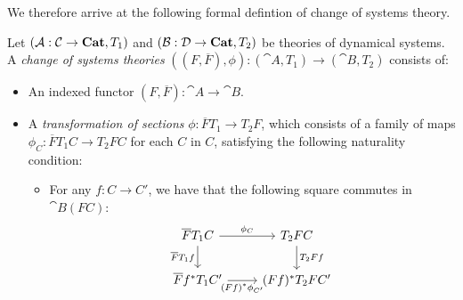 \documentclass[DynamicalBook]{subfiles}
\begin{document}
We therefore arrive at the following formal defintion of change of systems theory.
\begin{definition}\label{def.change_of_doctrine}
  Let $(\mathcal{A} : \mathcal{C} \to \textbf{Cat}, T_1)$ and $(\mathcal{B} : \mathcal{D} \to
  \textbf{Cat}, T_2)$ be theories of dynamical systems. A \emph{change of systems theories}
  $((F, \overline{F}), \phi) : (\cat{A}, T_1) \to (\cat{B}, T_2)$ consists of:
\begin{itemize}
  \item An indexed functor $(F, \overline{F}) : \cat{A} \to \cat{B}$. 
  \item A \emph{transformation of sections} $\phi : \overline{F}T_1 \to T_2 F$,
    which consists of a family of maps $\phi_C : \overline{F}T_1 C \to T_2 FC$
    for each $C$ in $C$, satisfying the following naturality condition:
    \begin{itemize}
      \item For any $f : C \to C'$, we have that the following square commutes
        in $\cat{B}(FC)$:
        \begin{equation}\label{eqn.transformation_of_sections}
\begin{tikzcd}
\overline{F}T_1 C  \ar[d, "\overline{F}T_1f"'] \ar[r, "\phi_C"]& T_2 F C \ar[d, "T_2Ff"] \\
\overline{F}f^{\ast}T_1 C' \ar[r,"(Ff)^{\ast}\phi_{C'}"']& (Ff)^{\ast}T_2 FC'
\end{tikzcd}
\end{equation}
\end{itemize}

\end{itemize} 
\end{definition}
\end{document}
